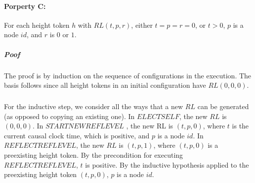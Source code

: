 \paragraph{Porperty C:}For each height token $h$ with $RL (t, p, r)$, either $t = p = r = 0$, or $t > 0$, $p$ is a node $id$, and $r$ is $0$ or $1$.
\subparagraph{Poof}The proof is by induction on the sequence of configurations in the execution. The basis follows since all height tokens in an initial configuration have $RL (0, 0, 0)$.
\subparagraph{}For the inductive step, we consider all the ways that a new $RL$ can be generated (as opposed to copying an existing one). In $ELECTSELF$, the new $RL$ is $(0,0,0)$. In $STARTNEWREFLEVEL$ , the new RL is $(t, p, 0)$, where $t$ is the current causal clock time, which is positive, and $p$ is a node $id$. In $REFLECTREFLEVEL$, the new $RL$ is $(t, p, 1)$, where $(t, p, 0)$ is a preexisting height token. By the precondition for executing $REFLECTREFLEVEL$, $t$ is positive. By the inductive hypothesis applied to the preexisting height token $(t, p, 0)$, $p$ is a node $id$.
